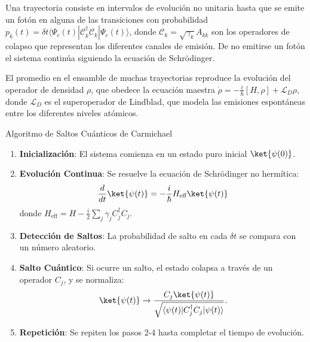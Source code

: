 \documentclass[11pt]{beamer}
\renewcommand{\footnotesize}{\tiny}
\begin{document}
    
    
    
    \begin{frame}
        \justifying
        Una trayectoria consiste en intervalos de evoluci\'on no unitaria hasta que se emite un fot\'on en alguna de las transiciones con 
        probabilidad $p_k(t) = \delta t \langle \Psi_c(t) | \mathcal{C}_k^\dagger \mathcal{C}_k | \Psi_c(t) \rangle$, 
        donde $\mathcal{C}_k = \sqrt{\gamma_k} A_{kk}$ son los operadores de colapso que representan los diferentes canales de emisión. De no emitirse un fot\'on el sistema contin\'ua siguiendo la ecuaci\'on de Schr\"odinger.
        
        El promedio en el ensamble de muchas trayectorias reproduce la evolución del operador de densidad $\rho$, que obedece la ecuación maestra $\dot{\rho} = -\frac{i}{\hbar} [H, \rho] + \mathcal{L}_D \rho$, donde $\mathcal{L}_D$ es el superoperador de Lindblad, que modela las emisiones espontáneas entre los diferentes niveles atómicos. 
    \end{frame}

   

    \begin{frame}{Algoritmo de Saltos Cuánticos de Carmichael}
        \justifying
        \vspace{0.3cm}
    
        \begin{enumerate}
            \item \textbf{Inicialización}: El sistema comienza en un estado puro inicial $\ket{\psi(0)}$.
            \item \textbf{Evolución Continua}: Se resuelve la ecuación de Schrödinger no hermítica:
            \[
            \frac{d}{dt}\ket{\psi(t)} = -\frac{i}{\hbar} H_{\text{eff}} \ket{\psi(t)}
            \]
            donde $H_{\text{eff}} = H - \frac{i}{2} \sum_j \gamma_j C_j^\dagger C_j$.
            
            \item \textbf{Detección de Saltos}: La probabilidad de salto en cada $\delta t$ se compara con un número aleatorio.
            
            \item \textbf{Salto Cuántico}: Si ocurre un salto, el estado colapsa a través de un operador $C_j$, y se normaliza:
            \[
            \ket{\psi(t)} \rightarrow \frac{C_j \ket{\psi(t)}}{\sqrt{\langle \psi(t) | C_j^\dagger C_j | \psi(t) \rangle}}.
            \]
            
            \item \textbf{Repetición}: Se repiten los pasos 2-4 hasta completar el tiempo de evolución.
        \end{enumerate}
    
    
    
        \vspace{0.2cm}
        \footnotesize
    \end{frame}
\end{document}

